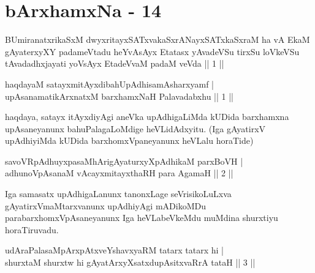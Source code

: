 \chapter{bArxhamxNa - 14}
\begin{kandikeshl}
BUmiranatxrikaSxM dwyxritayxSATxvakaSxrANayxSATxkaSxraM ha vA EkaM gAyaterxyXY padameVtadu heYvAsAyx Etatasx yAvadeVSu tirxSu loVkeVSu tAvadadhxjayati yoV\s sAyx EtadeVvaM padaM veVda || 1 ||
\end{kandikeshl}


\begin{shl}
haqdayaM satayxmitAyxdibahUpAdhisamAsharxyamf | \\
upAsanamatikArxnatxM barxhamxNaH Palavadabxhu \hfill ||  1 || 
\end{shl}

\begin{artha}
haqdaya, satayx itAyxdiyAgi aneVka upAdhigaLiMda kUDida barxhamxna 
upAsaneyanunx bahuPalagaLoMdige heVLidAdxyitu. (Iga gAyatirxV 
upAdhiyiMda kUDida barxhomxVpaneyanunx heVLalu horaTide)
\end{artha}

\begin{shl}
savoVRpAdhuyxpasaMhArigAyaturxyXpAdhikaM parxBoVH  | \\
adhunoVpAsanaM vAcayxmitayxthaRH para AgamaH \hfill ||  2 || 
\end{shl}

\begin{artha}
Iga samasatx upAdhigaLanunx tanonxLage seVrisikoLuLxva 
gAyatirxVmaMtarxvanunx upAdhiyAgi mADikoMDu parabarxhomxVpAsaneyanunx 
Iga heVLabeVkeMdu muMdina shurxtiyu horaTiruvadu.
\end{artha}


\begin{shl}
udAraPalasaMpArxpAtxveYshavxyaRM tatarx tatarx hi   | \\
shurxtaM shurxtw hi gAyatArxyXsatxdupAsitxvaRrA tataH \hfill ||  3 || 
\end{shl}

